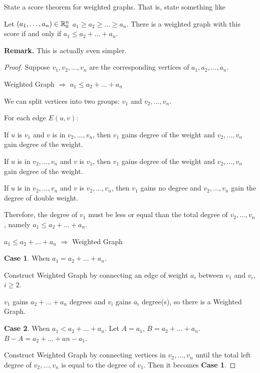 
\begin{exercise}
  State a score theorem for weighted graphs. That is, state something like
  \begin{theorem}
     Let $(a_1,\dots,a_n) \in \mathbb{R}_0^n$ $a_1 \geq a_2 \geq \dots \geq a_n$. There is a weighted graph
      with this score if and only if $a_1 \leq a_2 + \dots + a_n$.
  \end{theorem}
  \textbf{Remark.} This 
  is actually even simpler.
\end{exercise}


\begin{exercise}
    \begin{proof}
Suppose $v_1, v_2 , \dots, v_n$ are the corresponding vertices of $a_1, a_2, \dots, a_n$.

Weighted Graph $ \Rightarrow $ $a_1 \leq a_2 + \dots + a_n$

We can split vertices into two groups: $v_1$ and $v_2, \dots, v_n$.

    For each edge $E(u,v)$:

    If $u$ is $v_1$ and $v$ is in $v_2, \dots, v_n$, then $v_1$ gains degree of the weight and $v_2, \dots, v_n$ gain degree of the weight.

    If $u$ is in $v_2, \dots, v_n$ and $v$ is $v_1$, then $v_1$ gains degree of the weight and $v_2, \dots, v_n$ gain degree of the weight.

    If $u$ is in $v_2, \dots, v_n$ and $v$ is $v_2, \dots, v_n$, then $v_1$ gains no degree and $v_2, \dots, v_n$ gain the degree of double weight.

    Therefore, the degree of $v_1$ must be less or equal than the total degree of $v_2, \dots, v_n$, namely $a_1 \leq a_2 + \dots + a_n$.


$a_1 \leq a_2 + \dots + a_n$ $ \Rightarrow $ Weighted Graph

    \textbf{Case 1}. When $a_1 = a_2 + \dots + a_n$.

    Construct Weighted Graph by connecting an edge of weight $a_i$ between $v_1$ and $v_i$, $i \geq 2$.

    $v_1$ gains $a_2 + \dots + a_n$ degrees and $v_i$ gains $a_i$ degree(s), so there is a Weighted Graph.

    \textbf{Case 2}. When $a_1 < a_2 + \dots + a_n$.
    Let $A = a_1$, $B = a_2 + \dots + a_n$. $B - A = a_2 + \dots + an - a_1$.

    Construct Weighted Graph by connecting vertices in $v_2, \dots, v_n$ until the total left degree of $v_2, \dots , v_n$ is equal to the degree of $v_1$. Then it becomes \textbf{Case 1}.


\end{proof}
\end{exercise}
